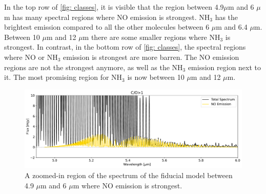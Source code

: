 \documentclass[twoside, single, authoryear, semicolon]{lion-msc}
\newcommand{\4}{$_4$}
\newcommand{\3}{$_3$}
\newcommand{\2}{$_2$}
\begin{document}
In the top row of \autoref{fig: classes}, it is visible that the region between 4.9$\mu$m and 6 $\mu$m has many spectral regions where NO emission is strongest. NH\3 has the brightest emission compared to all the other molecules between 6 $\mu$m and 6.4 $\mu$m. Between 10 $\mu$m and 12 $\mu$m there are some smaller regions where NH\3 is strongest. In contrast, in the bottom row of \autoref{fig: classes}, the spectral regions where NO or NH\3 emission is strongest are more barren. The NO emission regions are not the strongest anymore, as well as the NH\3 emission region next to it. The most promising region for NH\3 is now between 10 $\mu$m and 12 $\mu$m. 

\begin{figure}[!ht]
    \centering
    \includegraphics[width=\linewidth]{Figures/NO_region.pdf}
    \caption{A zoomed-in region of the spectrum of the fiducial model between 4.9 $\mu$m and 6 $\mu$m where NO emission is strongest.}
    \label{fig: NO region}
\end{figure}
\end{document}
